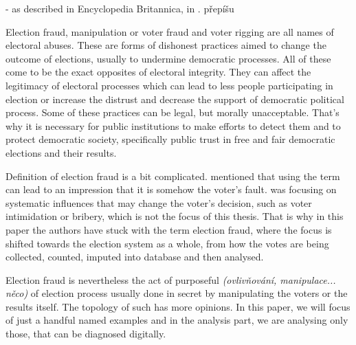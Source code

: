   \begin{flushright}
  - as described in Encyclopedia Britannica, in \citeyear{election}. přepíšu
  \end{flushright}





Election fraud, manipulation or voter fraud and voter rigging are all names of electoral abuses. These are forms of dishonest practices aimed to change the outcome of elections, usually to undermine democratic processes. All of these come to be the exact opposites of electoral integrity. They can affect the legitimacy of electoral processes which can lead to less people participating in election or increase the distrust and decrease the support of democratic political process. Some of these practices can be legal, but morally unacceptable. That's why it is necessary for public institutions to make efforts to detect them and to protect democratic society, specifically public trust in free and fair democratic elections and their results. \cite{Lehoucq2003, Levitt2007, election, Lebeda2021}

Definition of election fraud is a bit complicated. \citeauthor{Levitt2007} mentioned that using the term  can lead to an impression that it is somehow the voter's fault. \citeauthor{Lehoucq2003} was focusing on systematic influences that may change the voter's decision, such as voter intimidation or bribery, which is not the focus of this thesis. That is why in this paper the authors have stuck with the term election fraud, where the focus is shifted towards the election system as a whole, from how the votes are being collected, counted, imputed into database and then analysed. 

Election fraud is nevertheless the act of purposeful \emph{(ovlivňování, manipulace... něco)} of election process usually  done in secret by manipulating the voters or the results itself. The topology of such has more opinions. In this paper, we will focus of just a handful named examples and in the analysis part, we are analysing only those, that can be diagnosed digitally. \cite{Lebeda2021}



